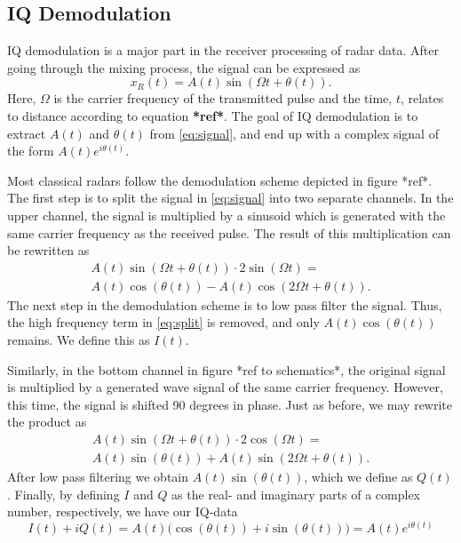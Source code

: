 

\begin{appendices}

	\chapter{IQ Demodulation}
	IQ demodulation is a major part in the receiver processing of radar data. After going through the mixing process, the signal can be expressed as \citep{lee_1991}
\begin{equation}
\label{eq:signal}
	x_R(t)=A(t)\sin(\Omega t+\theta(t)).
\end{equation}
Here, $\Omega$ is the carrier frequency of the transmitted pulse and the time, $t$, relates to distance according to equation \textbf{*ref*}. The goal of IQ demodulation is to extract $A(t)$ and $\theta(t)$ from \eqref{eq:signal}, and end up with a complex signal of the form $A(t)e^{i\theta(t)}$.

Most classical radars follow the demodulation scheme depicted in figure *ref*. The first step is to split the signal in \eqref{eq:signal} into two separate channels. In the upper channel, the signal is multiplied by a sinusoid which is generated with the same carrier frequency as the received pulse. The result of this multiplication can be rewritten as
\begin{gather}
	 A(t)\sin(\Omega t+\theta(t))\cdot 2\sin(\Omega t) = \\
	\label{eq:split}
 	 A(t)\cos(\theta(t))-A(t)\cos(2\Omega t+\theta(t)).
\end{gather}
The next step in the demodulation scheme is to low pass filter the signal. Thus, the high frequency term in \eqref{eq:split} is removed, and only $A(t)\cos(\theta(t))$ remains. We define this as $I(t)$.

Similarly, in the bottom channel in figure *ref to schematics*, the original signal is multiplied by a generated wave signal of the same carrier frequency. However, this time, the signal is shifted 90 degrees in phase. Just as before, we may rewrite the product as
\begin{gather}
	 A(t)\sin(\Omega t+\theta(t))\cdot 2\cos(\Omega t) = \\
	\label{eq:split2}
 	 A(t)\sin(\theta(t))+A(t)\sin(2\Omega t+\theta(t)).
\end{gather}
After low pass filtering we obtain $A(t)\sin(\theta(t))$, which we define as $Q(t)$. Finally, by defining $I$ and $Q$ as the real- and imaginary parts of a complex number, respectively, we have our IQ-data
\begin{equation}
	I(t)+iQ(t)=A(t)\Big(\cos(\theta(t))+i\sin(\theta(t))\Big)=A(t)e^{i\theta(t)}
\end{equation}

\end{appendices}